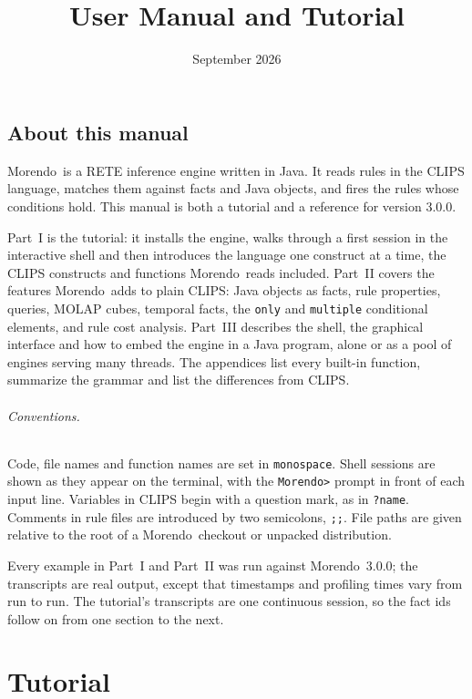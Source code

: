\documentclass[11pt,letterpaper,openany]{book}
\title{\Morendo\ \version\\[0.5em]\large User Manual and Tutorial}
\author{}
\date{September 2026}
\newcommand{\fn}[1]{\texttt{#1}}
\newcommand{\Morendo}{Morendo}
\newcommand{\version}{3.0.0}
\begin{document}
\frontmatter
\maketitle

\chapter*{About this manual}

\Morendo\ is a RETE inference engine written in Java. It reads rules in the
CLIPS language, matches them against facts and Java objects, and fires the
rules whose conditions hold. This manual is both a tutorial and a reference
for version \version.

Part~I is the tutorial: it installs the engine, walks through a first
session in the interactive shell and then introduces the language one
construct at a time, the CLIPS constructs and functions \Morendo\ reads
included. Part~II covers the features \Morendo\ adds to plain CLIPS:
Java objects as facts, rule properties, queries, MOLAP cubes, temporal
facts, the \fn{only} and \fn{multiple} conditional elements, and rule
cost analysis. Part~III describes the shell, the graphical interface and
how to embed the engine in a Java program, alone or as a pool of engines
serving many threads. The appendices list every built-in function,
summarize the grammar and list the differences from CLIPS.

\paragraph{Conventions.} Code, file names and function names are set in
\fn{monospace}. Shell sessions are shown as they appear on the terminal,
with the \fn{Morendo>} prompt in front of each input line. Variables in
CLIPS begin with a question mark, as in \fn{?name}. Comments in rule files
are introduced by two semicolons, \fn{;;}. File paths are given relative to
the root of a \Morendo\ checkout or unpacked distribution.

Every example in Part~I and Part~II was run against \Morendo\ \version; the
transcripts are real output, except that timestamps and profiling times
vary from run to run. The tutorial's transcripts are one continuous
session, so the fact ids follow on from one section to the next.

\tableofcontents

\mainmatter

\part{Tutorial}




\end{document}
